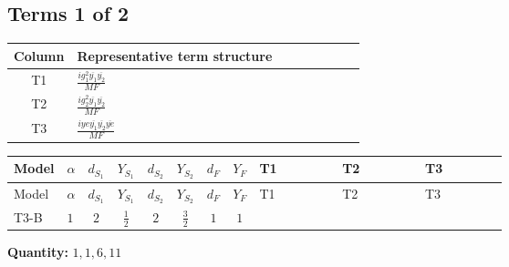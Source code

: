 \documentclass[8pt]{article}
\begin{document}
\begin{landscape}
\subsection*{Terms 1 of 2}
\begin{center}
\begin{tabular}{@{}c >{\raggedright\arraybackslash}p{0.82\linewidth}@{}}
\toprule
Column & Representative term structure \\
\midrule
T1 & \(\displaystyle \frac{i g_{1}^{2} \overline{y_{1}} \overline{y_{2}}}{MF}\) \\
\midrule
T2 & \(\displaystyle \frac{i g_{2}^{2} \overline{y_{1}} \overline{y_{2}}}{MF}\) \\
\midrule
T3 & \(\displaystyle \frac{i ye \overline{y_{1}} \overline{y_{2}} \overline{ye}}{MF}\) \\
\midrule
\bottomrule
\end{tabular}
\end{center}
\smallskip
\tiny
\begin{longtable}{@{}llcccccc >{\raggedright\arraybackslash}p{0.21\linewidth} >{\raggedright\arraybackslash}p{0.21\linewidth} >{\raggedright\arraybackslash}p{0.21\linewidth}@{}}
\toprule
Model & $\alpha$ & $d_{S_1}$ & $Y_{S_1}$ & $d_{S_2}$ & $Y_{S_2}$ & $d_F$ & $Y_F$ & T1 & T2 & T3 \\
\midrule
\endfirsthead
\toprule
Model & $\alpha$ & $d_{S_1}$ & $Y_{S_1}$ & $d_{S_2}$ & $Y_{S_2}$ & $d_F$ & $Y_F$ & T1 & T2 & T3 \\
\midrule
\endhead
T3-B & $1$ & $2$ & $\frac{1}{2}$ & $2$ & $\frac{3}{2}$ & $1$ & $1$ & \scriptsize\adjustbox{max width=\linewidth}{$\begin{gathered} \frac{3 i g_{1}^{2} \overline{y_{1}} \overline{y_{2}}}{2 MF}\end{gathered}$} & \scriptsize\adjustbox{max width=\linewidth}{$\begin{gathered} \frac{3 i g_{2}^{2} \overline{y_{1}} \overline{y_{2}}}{4 MF}\end{gathered}$} & \scriptsize\adjustbox{max width=\linewidth}{$\begin{gathered} - \frac{i ye \overline{y_{1}} \overline{y_{2}} \overline{ye}}{4 MF}\end{gathered}$} \\
\midrule
\bottomrule
\end{longtable}
\clearpage
\noindent\textbf{Quantity: }$\mathrm{1,1,6,11}$\par\smallskip

\end{landscape}
\end{document}
